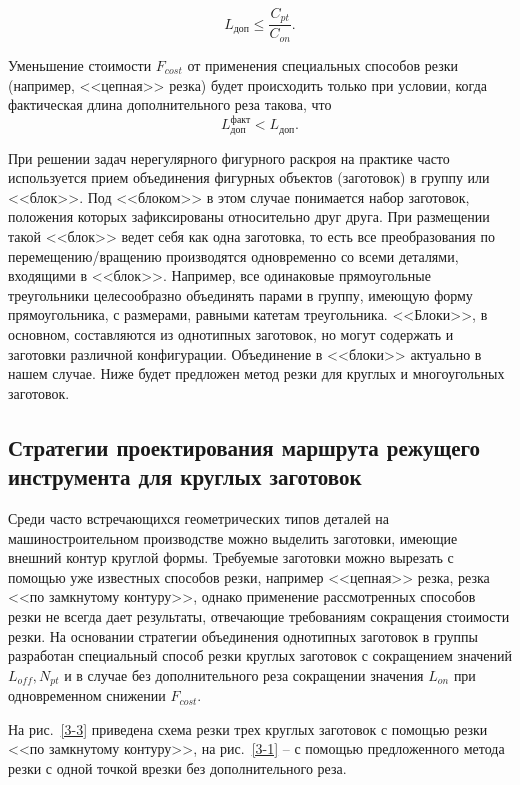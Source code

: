 \documentclass[11pt,twoside,openany]{report}
\begin{document}
\begin{equation}
  L_\text{доп} \leqslant \frac{C_{pt}}{C_{on}}
  .
  \label{l-dop}
\end{equation}

Уменьшение стоимости
$F_{cost}$
от применения специальных способов резки
(например, <<цепная>> резка)
будет происходить только при условии,
когда фактическая длина дополнительного реза
такова, что
\begin{equation}
  L_\text{доп}^\text{факт} < L_\text{доп}
  .
  \label{l-fact-dop}
\end{equation}

При решении задач нерегулярного фигурного раскроя
на практике часто используется прием объединения
фигурных объектов (заготовок)
в группу или <<блок>>.
Под <<блоком>> в этом случае понимается набор заготовок,
положения которых зафиксированы относительно друг друга.
При размещении такой <<блок>> ведет себя как одна заготовка,
то есть все преобразования по перемещению/вращению производятся
одновременно со всеми деталями, входящими в <<блок>>.
Например, все одинаковые прямоугольные треугольники
целесообразно объединять парами в группу, имеющую форму прямоугольника,
с размерами, равными катетам треугольника.
<<Блоки>>, в основном, составляются из однотипных заготовок,
но могут содержать и заготовки различной конфигурации.
Объединение в <<блоки>> актуально в нашем случае.
Ниже будет предложен метод резки для круглых и многоугольных заготовок.

{\raggedright\subsection{
  Стратегии проектирования маршрута режущего инструмента
  для круглых заготовок
}}

Среди часто встречающихся геометрических типов деталей
на машиностроительном производстве можно выделить заготовки,
имеющие внешний контур круглой формы.
Требуемые заготовки можно вырезать с
помощью уже известных способов резки,
например <<цепная>> резка, резка <<по замкнутому контуру>>,
однако применение рассмотренных способов резки не всегда
дает результаты, отвечающие требованиям сокращения стоимости резки.
На основании стратегии объединения однотипных заготовок
в группы разработан специальный способ резки круглых
заготовок с сокращением значений
$L_{off}, N_{pt}$
и в случае без дополнительного реза сокращении значения
$L_{on}$
при одновременном снижении
$F_{cost}$.

На рис.~\ref{3-3}
приведена схема резки трех круглых заготовок
с помощью резки <<по замкнутому контуру>>,
на рис.~\ref{3-1}
-- с помощью предложенного метода резки
с одной точкой врезки без дополнительного реза.
\end{document}
